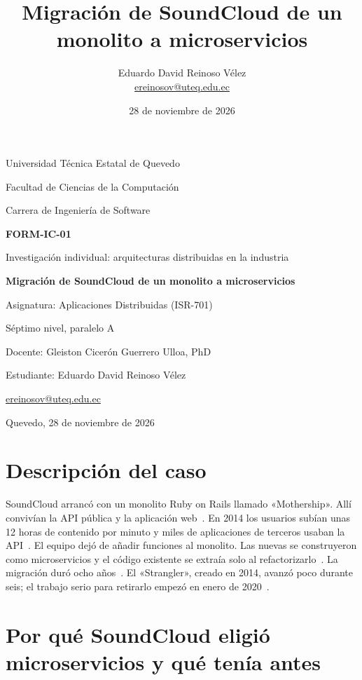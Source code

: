 \documentclass[11pt,a4paper]{article}
\title{Migración de SoundCloud de un monolito a microservicios}
\author{Eduardo David Reinoso Vélez\\\href{mailto:ereinosov@uteq.edu.ec}{ereinosov@uteq.edu.ec}}
\date{28 de noviembre de 2026}
\begin{document}
\begin{titlepage}
  \centering
  {\large Universidad Técnica Estatal de Quevedo\par}
  {\large Facultad de Ciencias de la Computación\par}
  {\large Carrera de Ingeniería de Software\par}
  \vspace{2cm}
  {\Large\bfseries FORM-IC-01\par}
  {\large Investigación individual: arquitecturas distribuidas en la industria\par}
  \vspace{1.5cm}
  {\Large\bfseries Migración de SoundCloud de un monolito a microservicios\par}
  \vspace{2cm}
  {\large Asignatura: Aplicaciones Distribuidas (ISR-701)\par}
  {\large Séptimo nivel, paralelo A\par}
  {\large Docente: Gleiston Cicerón Guerrero Ulloa, PhD\par}
  \vspace{1.5cm}
  {\large Estudiante: Eduardo David Reinoso Vélez\par}
  {\large \href{mailto:ereinosov@uteq.edu.ec}{ereinosov@uteq.edu.ec}\par}
  \vfill
  {\large Quevedo, 28 de noviembre de 2026\par}
\end{titlepage}

\section{Descripción del caso}

SoundCloud arrancó con un monolito Ruby on Rails llamado «Mothership». Allí convivían la API pública y la aplicación web~\cite{calcado2014monolith}. En 2014 los usuarios subían unas 12 horas de contenido por minuto y miles de aplicaciones de terceros usaban la API~\cite{calcado2014monolith}. El equipo dejó de añadir funciones al monolito. Las nuevas se construyeron como microservicios y el código existente se extraía solo al refactorizarlo~\cite{calcado2014monolith}. La migración duró ocho años~\cite{obrien2022strangler}. El «Strangler», creado en 2014, avanzó poco durante seis; el trabajo serio para retirarlo empezó en enero de 2020~\cite{obrien2022strangler}.

\section{Por qué SoundCloud eligió microservicios y qué tenía antes}
\end{document}
